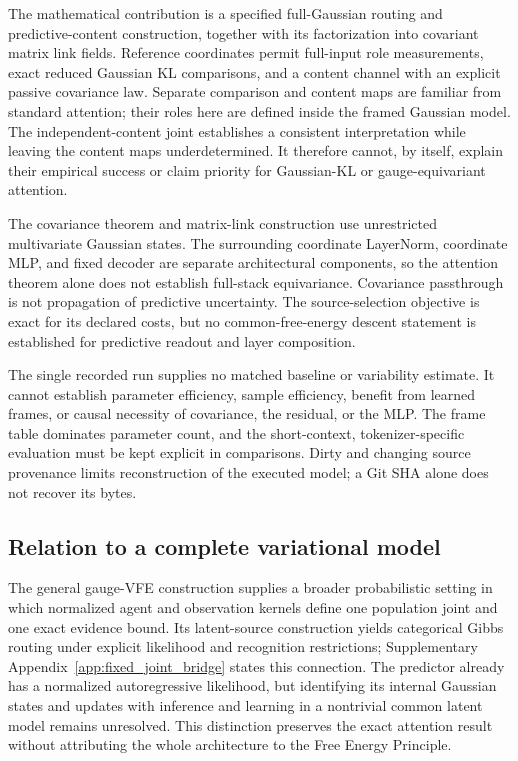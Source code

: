 \documentclass[twoside,11pt]{article}
\begin{document}
The mathematical contribution is a specified full-Gaussian routing and predictive-content construction, together with its factorization into covariant matrix link fields. Reference coordinates permit full-input role measurements, exact reduced Gaussian KL comparisons, and a content channel with an explicit passive covariance law. Separate comparison and content maps are familiar from standard attention; their roles here are defined inside the framed Gaussian model. The independent-content joint establishes a consistent interpretation while leaving the content maps underdetermined. It therefore cannot, by itself, explain their empirical success or claim priority for Gaussian-KL or gauge-equivariant attention.

The covariance theorem and matrix-link construction use unrestricted multivariate Gaussian states. The surrounding coordinate LayerNorm, coordinate MLP, and fixed decoder are separate architectural components, so the attention theorem alone does not establish full-stack equivariance. Covariance passthrough is not propagation of predictive uncertainty. The source-selection objective is exact for its declared costs, but no common-free-energy descent statement is established for predictive readout and layer composition. 

The single recorded run supplies no matched baseline or variability estimate. It cannot establish parameter efficiency, sample efficiency, benefit from learned frames, or causal necessity of covariance, the residual, or the MLP. The frame table dominates parameter count, and the short-context, tokenizer-specific evaluation must be kept explicit in comparisons. Dirty and changing source provenance limits reconstruction of the executed model; a Git SHA alone does not recover its bytes.

\subsection{Relation to a complete variational model}
The general gauge-VFE construction supplies a broader probabilistic setting in which normalized agent and observation kernels define one population joint and one exact evidence bound. Its latent-source construction yields categorical Gibbs routing under explicit likelihood and recognition restrictions; Supplementary Appendix~\ref{app:fixed_joint_bridge} states this connection. The predictor already has a normalized autoregressive likelihood, but identifying its internal Gaussian states and updates with inference and learning in a nontrivial common latent model remains unresolved. This distinction preserves the exact attention result without attributing the whole architecture to the Free Energy Principle.
\end{document}
